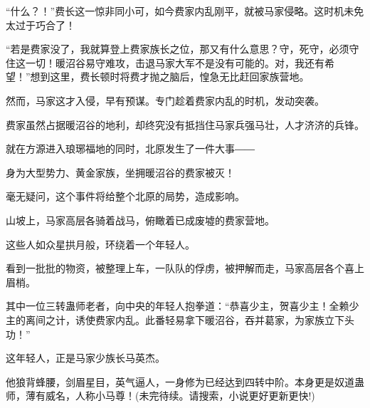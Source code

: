 \begin{this_body}
“什么？！”费长这一惊非同小可，如今费家内乱刚平，就被马家侵略。这时机未免太过于巧合了！

“若是费家没了，我就算登上费家族长之位，那又有什么意思？守，死守，必须守住这一切！暖沼谷易守难攻，击退马家大军不是没有可能的。对，我还有希望！”想到这里，费长顿时将费才抛之脑后，惶急无比赶回家族营地。

然而，马家这才入侵，早有预谋。专门趁着费家内乱的时机，发动突袭。

费家虽然占据暖沼谷的地利，却终究没有抵挡住马家兵强马壮，人才济济的兵锋。

就在方源进入琅琊福地的同时，北原发生了一件大事――

身为大型势力、黄金家族，坐拥暖沼谷的费家被灭！

毫无疑问，这个事件将给整个北原的局势，造成影响。

山坡上，马家高层各骑着战马，俯瞰着已成废墟的费家营地。

这些人如众星拱月般，环绕着一个年轻人。

看到一批批的物资，被整理上车，一队队的俘虏，被押解而走，马家高层各个喜上眉梢。

其中一位三转蛊师老者，向中央的年轻人抱拳道：“恭喜少主，贺喜少主！全赖少主的离间之计，诱使费家内乱。此番轻易拿下暖沼谷，吞并葛家，为家族立下头功！”

这年轻人，正是马家少族长马英杰。

他狼背蜂腰，剑眉星目，英气逼人，一身修为已经达到四转中阶。本身更是奴道蛊师，薄有威名，人称小马尊！(未完待续。请搜索，小说更好更新更快!)

\end{this_body}

